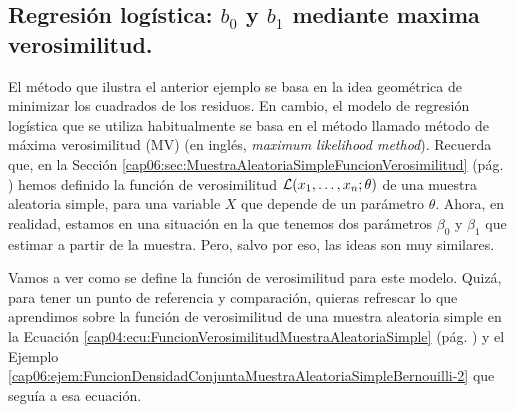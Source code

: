 \subsection{Regresión logística:  $b_0$ y $b_1$  mediante maxima verosimilitud.}
\label{cap13:subsection:ParametrosCurvaSigmoideaMedianteMaximaVerosimilitud}

El método que ilustra el anterior ejemplo se basa en la idea geométrica de minimizar los cuadrados de los residuos. En cambio, el modelo de regresión logística que se utiliza habitualmente se basa en el m\'etodo llamado {\sf método de máxima verosimilitud (MV)} (en inglés, {\em maximum likelihood  method}). Recuerda que, en la Sección \ref{cap06:sec:MuestraAleatoriaSimpleFuncionVerosimilitud} (pág. \pageref{cap06:sec:MuestraAleatoriaSimpleFuncionVerosimilitud}) hemos definido la función de verosimilitud ${\cal L}(x_1,\ldots,x_n;\theta)$ de una muestra aleatoria simple, para una variable $X$ que depende de un parámetro $\theta$. Ahora, en realidad, estamos en una situación en la que tenemos dos parámetros $\beta_0$ y $\beta_1$ que estimar a partir de la muestra. Pero, salvo por eso, las ideas son muy similares.

Vamos a ver como se define la función de verosimilitud para este modelo. Quizá, para tener un punto de referencia y comparación,  quieras refrescar lo que aprendimos  sobre la  función de verosimilitud de una muestra aleatoria simple en la Ecuación \ref{cap04:ecu:FuncionVerosimilitudMuestraAleatoriaSimple} (pág. \pageref{cap04:ecu:FuncionVerosimilitudMuestraAleatoriaSimple}) y el Ejemplo \ref{cap06:ejem:FuncionDensidadConjuntaMuestraAleatoriaSimpleBernouilli-2} que seguía a esa ecuación.

